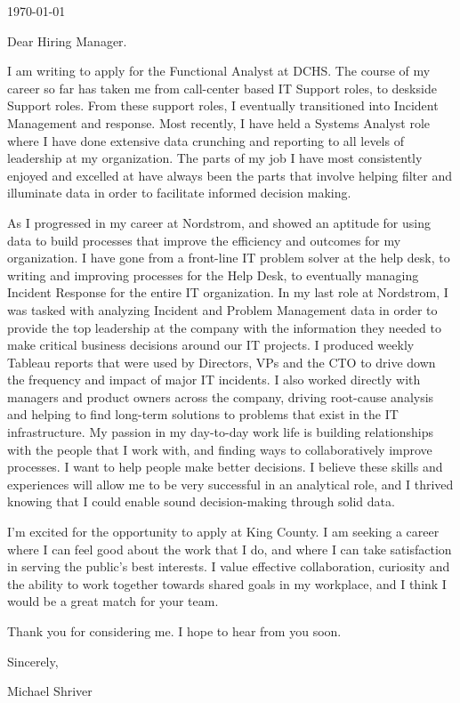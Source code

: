 \documentclass[10pt,oneside]{article}
\begin{document}
\hfill\dte\today
\heading
\vspace{\baselineskip}
\vspace{\baselineskip}

Dear Hiring Manager.

\vspace{\baselineskip}

I am writing to apply for the Functional Analyst at DCHS. The course of my career so far has taken me from call-center based IT Support roles, to deskside Support roles. From these support roles, I eventually transitioned into Incident Management and response. Most recently, I have held a Systems Analyst role where I have done extensive data crunching and reporting to all levels of leadership at my organization. The parts of my job I have most consistently enjoyed and excelled at have always been the parts that involve helping filter and illuminate data in order to facilitate informed decision making.

\vspace{\baselineskip}

As I progressed in my career at Nordstrom, and showed an aptitude for using data to build processes that improve the efficiency and outcomes for my organization. I have gone from a front-line IT problem solver at the help desk, to writing and improving processes for the Help Desk, to eventually managing Incident Response for the entire IT organization. In my last role at Nordstrom, I was tasked with analyzing Incident and Problem Management data in order to provide the top leadership at the company with the information they needed to make critical business decisions around our IT projects. I produced weekly Tableau reports that were used by Directors, VPs and the CTO to drive down the frequency and impact of major IT incidents. I also worked directly with managers and product owners across the company, driving root-cause analysis and helping to find long-term solutions to problems that exist in the IT infrastructure. My passion in my day-to-day work life is building relationships with the people that I work with, and finding ways to collaboratively improve processes. I want to help people make better decisions. I believe these skills and experiences will allow me to be very successful in an analytical role, and I thrived knowing that I could enable sound decision-making through solid data.

\vspace{\baselineskip}

I’m excited for the opportunity to apply at King County. I am seeking a career where I can feel good about the work that I do, and where I can take satisfaction in serving the public's best interests. I value effective collaboration, curiosity and the ability to work together towards shared goals in my workplace, and I think I would be a great match for your team.

\vspace{\baselineskip}

Thank you for considering me. I hope to hear from you soon.

\vspace{\baselineskip}

Sincerely,

\vspace{\baselineskip}

Michael Shriver
\end{document}
